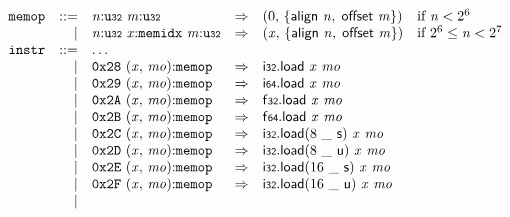 $$
\begin{array}{@{}l@{}rrlll@{}l@{}}
& {\mathtt{memop}} &::=& {\mathit{n}}{:}{\mathtt{u{\scriptstyle32}}}~{\mathit{m}}{:}{\mathtt{u{\scriptstyle32}}} &\Rightarrow& (0,\, \{ \begin{array}[t]{@{}l@{}}
\mathsf{align}~{\mathit{n}},\; \mathsf{offset}~{\mathit{m}} \}\end{array}) &\quad
  \mbox{if}~{\mathit{n}} < {2^{6}} \\ &&|&
{\mathit{n}}{:}{\mathtt{u{\scriptstyle32}}}~{\mathit{x}}{:}{\mathtt{memidx}}~{\mathit{m}}{:}{\mathtt{u{\scriptstyle32}}} &\Rightarrow& ({\mathit{x}},\, \{ \begin{array}[t]{@{}l@{}}
\mathsf{align}~{\mathit{n}},\; \mathsf{offset}~{\mathit{m}} \}\end{array}) &\quad
  \mbox{if}~{2^{6}} \leq {\mathit{n}} < {2^{7}} \\
& {\mathtt{instr}} &::=& \dots \\ &&|&
\mathtt{0x28}~({\mathit{x}},\, {\mathit{mo}}){:}{\mathtt{memop}} &\Rightarrow& \mathsf{i{\scriptstyle32}}.\mathsf{load}~{\mathit{x}}~{\mathit{mo}} \\ &&|&
\mathtt{0x29}~({\mathit{x}},\, {\mathit{mo}}){:}{\mathtt{memop}} &\Rightarrow& \mathsf{i{\scriptstyle64}}.\mathsf{load}~{\mathit{x}}~{\mathit{mo}} \\ &&|&
\mathtt{0x2A}~({\mathit{x}},\, {\mathit{mo}}){:}{\mathtt{memop}} &\Rightarrow& \mathsf{f{\scriptstyle32}}.\mathsf{load}~{\mathit{x}}~{\mathit{mo}} \\ &&|&
\mathtt{0x2B}~({\mathit{x}},\, {\mathit{mo}}){:}{\mathtt{memop}} &\Rightarrow& \mathsf{f{\scriptstyle64}}.\mathsf{load}~{\mathit{x}}~{\mathit{mo}} \\ &&|&
\mathtt{0x2C}~({\mathit{x}},\, {\mathit{mo}}){:}{\mathtt{memop}} &\Rightarrow& {\mathsf{i{\scriptstyle32}}.\mathsf{load}}{(8~\mathsf{\_}~\mathsf{s})}~{\mathit{x}}~{\mathit{mo}} \\ &&|&
\mathtt{0x2D}~({\mathit{x}},\, {\mathit{mo}}){:}{\mathtt{memop}} &\Rightarrow& {\mathsf{i{\scriptstyle32}}.\mathsf{load}}{(8~\mathsf{\_}~\mathsf{u})}~{\mathit{x}}~{\mathit{mo}} \\ &&|&
\mathtt{0x2E}~({\mathit{x}},\, {\mathit{mo}}){:}{\mathtt{memop}} &\Rightarrow& {\mathsf{i{\scriptstyle32}}.\mathsf{load}}{(16~\mathsf{\_}~\mathsf{s})}~{\mathit{x}}~{\mathit{mo}} \\ &&|&
\mathtt{0x2F}~({\mathit{x}},\, {\mathit{mo}}){:}{\mathtt{memop}} &\Rightarrow& {\mathsf{i{\scriptstyle32}}.\mathsf{load}}{(16~\mathsf{\_}~\mathsf{u})}~{\mathit{x}}~{\mathit{mo}} \\ &&|&

\end{array}$$
